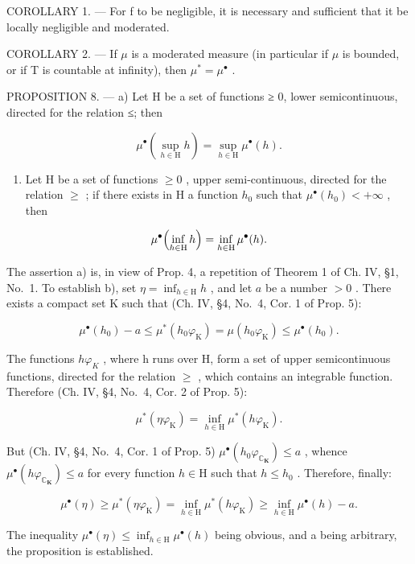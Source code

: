 COROLLARY 1. --- For f to be negligible, it is necessary and sufficient that it be locally negligible and moderated.

COROLLARY 2. --- If \(\mu\) is a moderated measure (in particular if \(\mu\) is bounded, or if T is countable at infinity), then \(\mu^{*} = \mu^{\bullet}\) .

PROPOSITION 8. --- a) Let H be a set of functions ≥ 0, lower semicontinuous, directed for the relation ≤; then

\[
\mu^ {\bullet} \left(\sup _ {h \in \mathrm{H}} h\right) = \sup _ {h \in \mathrm{H}} \mu^ {\bullet} (h).
\]

\begin{enumerate}
\def\labelenumi{\alph{enumi})}
\setcounter{enumi}{1}
\tightlist
\item
  Let H be a set of functions \(\geqslant0\) , upper semi-continuous, directed for the relation \(\geqslant\) ; if there exists in H a function \(h_{0}\) such that \(\mu^{\bullet}(h_{0})<+\infty\) , then
\end{enumerate}

\[
\mu^ {\bullet} \Bigl (\inf _ {h \in \mathrm{H}} h \Bigr) = \inf _ {h \in \mathrm{H}} \mu^ {\bullet} (h).
\]

The assertion a) is, in view of Prop. 4, a repetition of Theorem 1 of Ch. IV, §1, No.~1. To establish b), set \(\eta = \inf_{h\in \mathrm{H}}h\) , and let \(a\) be a number \(>0\) . There exists a compact set K such that (Ch. IV, §4, No.~4, Cor. 1 of Prop. 5):

\[
\mu^ {\bullet} (h _ {0}) - a \leqslant \mu^ {*} (h _ {0} \varphi_ {\mathrm{K}}) = \mu (h _ {0} \varphi_ {\mathrm{K}}) \leqslant \mu^ {\bullet} (h _ {0}).
\]

The functions \(h\varphi_{K}\) , where h runs over H, form a set of upper semicontinuous functions, directed for the relation \(\geqslant\) , which contains an integrable function. Therefore (Ch. IV, §4, No.~4, Cor. 2 of Prop. 5):

\[
\mu^ {*} (\eta \varphi_ {\mathrm{K}}) = \inf _ {h \in \mathrm{H}} \mu^ {*} (h \varphi_ {\mathrm{K}}).
\]

But (Ch. IV, §4, No.~4, Cor. 1 of Prop. 5) \(\mu^{\bullet}(h_{0}\varphi_{\mathbb{C}_{\mathbf{K}}}) \leqslant a\) , whence \(\mu^{\bullet}(h\varphi_{\mathbb{C}_{\mathbf{K}}}) \leqslant a\) for every function \(h \in \mathrm{H}\) such that \(h \leqslant h_{0}\) . Therefore, finally:

\[
\mu^ {\bullet} (\eta) \geqslant \mu^ {*} (\eta \varphi_ {\mathrm{K}}) = \inf _ {h \in \mathrm{H}} \mu^ {*} (h \varphi_ {\mathrm{K}}) \geqslant \inf _ {h \in \mathrm{H}} \mu^ {\bullet} (h) - a.
\]

The inequality \(\mu^{\bullet}(\eta) \leqslant \inf_{h \in \mathrm{H}} \mu^{\bullet}(h)\) being obvious, and a being arbitrary, the proposition is established.

